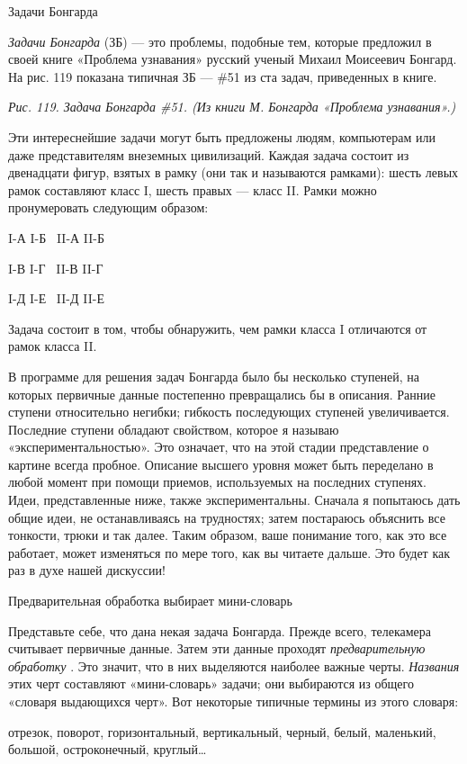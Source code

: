 \documentclass[../main.tex]{subfiles}
\begin{document}
Задачи Бонгарда

\emph{Задачи Бонгарда} (ЗБ) --- это проблемы, подобные тем, которые предложил в своей книге «Проблема узнавания» русский ученый Михаил Моисеевич Бонгард. На рис. 119 показана типичная ЗБ --- \#51 из ста задач, приведенных в книге.

\emph{Рис. 119. Задача Бонгарда \#51. (Из книги М. Бонгарда «Проблема узнавания».)}

Эти интереснейшие задачи могут быть предложены людям, компьютерам или даже представителям внеземных цивилизаций. Каждая задача состоит из двенадцати фигур, взятых в рамку (они так и называются рамками): шесть левых рамок составляют класс I, шесть правых --- класс II. Рамки можно пронумеровать следующим образом:

I-А I-Б~ II-А II-Б

I-В I-Г~ II-В II-Г

I-Д I-Е~ II-Д II-Е

Задача состоит в том, чтобы обнаружить, чем рамки класса I отличаются от рамок класса II.

В программе для решения задач Бонгарда было бы несколько ступеней, на которых первичные данные постепенно превращались бы в описания. Ранние ступени относительно негибки; гибкость последующих ступеней увеличивается. Последние ступени обладают свойством, которое я называю «экспериментальностью». Это означает, что на этой стадии представление о картине всегда пробное. Описание высшего уровня может быть переделано в любой момент при помощи приемов, используемых на последних ступенях. Идеи, представленные ниже, также экспериментальны. Сначала я попытаюсь дать общие идеи, не останавливаясь на трудностях; затем постараюсь объяснить все тонкости, трюки и так далее. Таким образом, ваше понимание того, как это все работает, может изменяться по мере того, как вы читаете дальше. Это будет как раз в духе нашей дискуссии!

Предварительная обработка выбирает мини-словарь

Представьте себе, что дана некая задача Бонгарда. Прежде всего, телекамера считывает первичные данные. Затем эти данные проходят \emph{предварительную обработку} . Это значит, что в них выделяются наиболее важные черты. \emph{Названия} этих черт составляют «мини-словарь» задачи; они выбираются из общего «словаря выдающихся черт». Вот некоторые типичные термины из этого словаря:

отрезок, поворот, горизонтальный, вертикальный, черный, белый, маленький, большой, остроконечный, круглый\ldots{}
\end{document}
